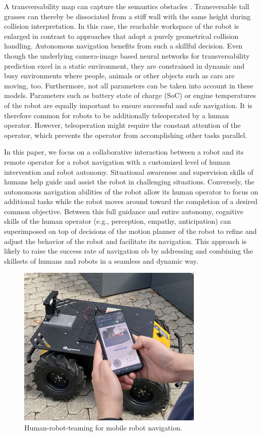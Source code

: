 \documentclass[letterpaper, 10 pt, conference]{ieeeconf}  %
\begin{document}
A transversability map can capture the semantics obstacles \cite{wayfaster,wayfast,leung2022hybrid}. Transversable tall grasses can thereby be dissociated from a stiff wall with the same height during collision interpretation. In this case, the reachable workspace of the robot is enlarged in contrast to approaches that adopt a purely geometrical collision handling. Autonomous navigation benefits from such a skillful decision. Even though the underlying camera-image based neural networks for  transversability prediction excel in a static environment, they are constrained in dynamic and busy environments where people, animals or other objects such as cars are moving, too. Furthermore, not all parameters can be taken into account in these models. Parameters such as battery state of charge (SoC) or engine temperatures of the robot are equally important to ensure successful and safe navigation. It is therefore common for robots to be additionally teleoperated by a human operator. However, teleoperation might require the constant attention of the operator, which prevents the operator from accomplishing other tasks parallel.




In this paper, we focus on a collaborative interaction between a  robot and its remote operator  for a  robot navigation with a customized level of human intervention and robot autonomy. Situational awareness and  supervision skills of humans help guide and assist the robot in challenging situations. Conversely, the autonomous navigation abilities of the robot allow its human operator to focus on additional tasks while the robot moves around toward the completion of a desired common objective. Between this full guidance and entire autonomy, cognitive skills of the human operator (e.g., perception, empathy, anticipation) can superimposed on top of decisions of the motion planner of the robot to refine and adjust the behavior of the robot and facilitate its navigation. This approach is likely to raise the success rate of navigation ob by addressing and combining the skillsets of humans and robots in a seamless and dynamic way.

\begin{figure}[t]
	\centerline{\includegraphics[width=8.9cm]{images/galaxycontrol.jpg}}
	\caption{Human-robot-teaming for mobile robot navigation.}
	\label{fig:galaxycontrol}
\end{figure}
\end{document}
